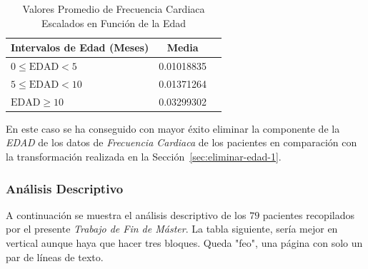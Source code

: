 \begin{table}[H]
    \centering
    \begin{tabular}{lcc}
        \toprule
        \textbf{Intervalos de Edad (Meses)} & \textbf{Media} \\
        \midrule
        $0 \leq \text{EDAD} < 5$ & 0.01018835 \\
        $5 \leq \text{EDAD} < 10$ & 0.01371264 \\
        $\text{EDAD} \geq 10$ & 0.03299302 \\
        \bottomrule
    \end{tabular}
    \caption{Valores Promedio de Frecuencia Cardiaca Escalados en Función de la Edad}
    \label{tabla:frecuencia-cardiaca-escalada-edad}
\end{table}

En este caso se ha conseguido con mayor éxito eliminar la componente de la \textit{EDAD} de los datos de \textit{Frecuencia Cardiaca} de los pacientes en comparación con la transformación realizada en la Sección~\ref{sec:eliminar-edad-1}.


\newpage
\subsubsection{Análisis Descriptivo}\label{sec:transformaciones-de-datos}

A continuación se muestra el análisis descriptivo de los $79$ pacientes recopilados por el presente \textit{Trabajo de Fin de Máster}. {\color{blue} La tabla siguiente, sería mejor en 
vertical aunque haya que hacer tres bloques. Queda "feo", una página con solo un par de líneas de texto.}


